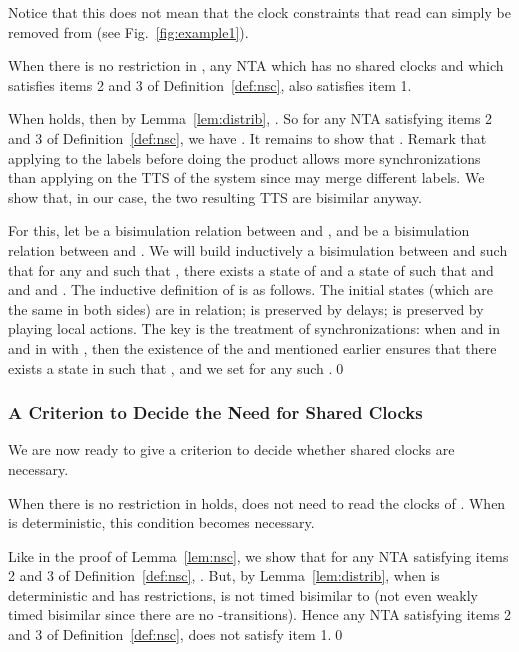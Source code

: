 \documentclass{LMCS}
\theoremstyle{plain}\newtheorem*{prop11}{Proposition~\ref{prop:states} bis}
\begin{document}
Notice that this does not mean that the clock constraints that read  can
simply be removed from  (see Fig.~\ref{fig:example1}).
\begin{lem}\label{lem:nsc}
  When there is no restriction in , any NTA  which has no shared clocks and which satisfies items 2 and 3 of
  Definition~\ref{def:nsc}, also satisfies item 1.
\end{lem}
\proof
  When  holds, then by Lemma~\ref{lem:distrib},
  . So for any NTA
   satisfying items 2 and 3 of Definition~\ref{def:nsc},
  we have . It remains to show that
  .
  Remark that applying  to the labels before doing the product allows
  more synchronizations than applying  on the TTS of the system since
   may merge different labels. We show that, in our case, the two
  resulting TTS are bisimilar anyway.

  For this, let  be a bisimulation relation between
   and , and  be a
  bisimulation relation between  and
  . We will build inductively a bisimulation  between
   and
   such that for any  and  such that , there exists
  a state  of  and a state  of
   such that  and  and  and .
The inductive definition of  is as follows. The initial states (which
  are the same in both sides) are in relation;  is preserved by delays;
   is preserved by playing local actions. The key is the treatment of
  synchronizations: when  and  in  and  in  with , then the
  existence of the  and  mentioned earlier ensures that there
  exists a state  in  such that
  , and we set  for any such .\qed

\subsubsection{A Criterion to Decide the Need for Shared Clocks}
We are now ready to give a criterion to decide whether shared clocks are necessary.
\begin{thm}\label{thm:nsc}
  When there is no restriction in  holds,  does not
  need to read the clocks of . When  is deterministic, this
  condition becomes necessary.
\end{thm}


  Like in the proof of Lemma~\ref{lem:nsc}, we show that for any NTA
   satisfying items 2 and 3 of Definition~\ref{def:nsc},
  . But, by
  Lemma~\ref{lem:distrib}, when  is deterministic and 
  has restrictions,  is not timed bisimilar to
   (not even weakly timed bisimilar since there are no
  -transitions). Hence any NTA  satisfying items
  2 and 3 of Definition~\ref{def:nsc}, does not satisfy item 1.\qed
\end{document}
